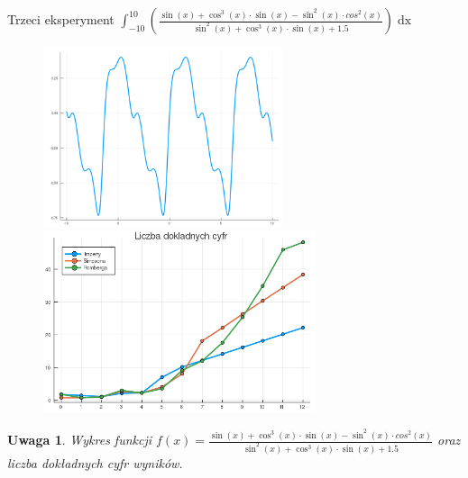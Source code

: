 \documentclass[11pt,wide]{article}
\newtheorem{remark}{Uwaga}
\begin{document}
Trzeci eksperyment \(\displaystyle \int_{-10}^{10} \left(\frac{\sin(x) + \cos^3(x) \cdot \sin(x) - \sin^2(x) \cdot cos^2(x)}{\sin^2(x) + \cos^3(x) \cdot \sin(x)+1.5}\right)\mathop{dx} \)
\begin{figure}[h!]
	\includegraphics[width=70mm,scale=0.5]{tryg3}
	\includegraphics[width=80mm,scale=0.5]{tryg_blad3}
\end{figure}
\begin{remark}
\centering
Wykres funkcji \(\displaystyle f(x) = \frac{\sin(x) + \cos^3(x) \cdot \sin(x) - \sin^2(x) \cdot cos^2(x)}{\sin^2(x) + \cos^3(x) \cdot \sin(x)+1.5}\) oraz liczba dokładnych cyfr wyników.
\end{remark}
\end{document}
